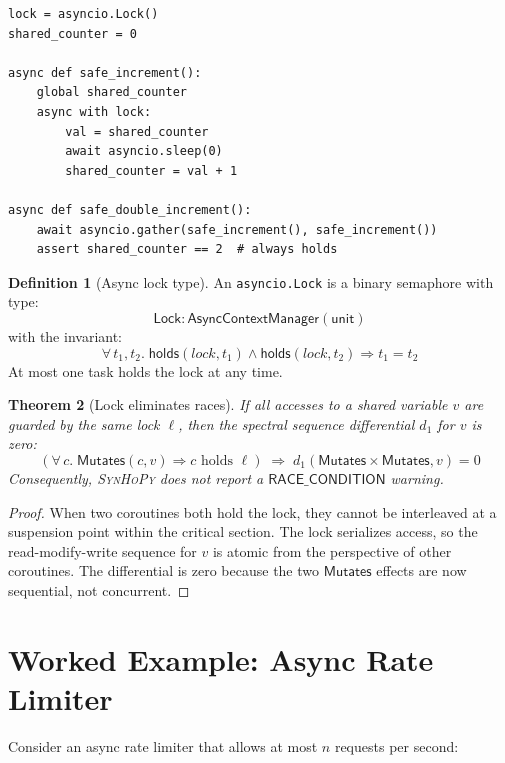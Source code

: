 \documentclass[11pt,a4paper]{report}
\theoremstyle{definition}
\newtheorem{definition}{Definition}[chapter]
\theoremstyle{plain}
\newtheorem{theorem}[definition]{Theorem}
\newcommand{\Mutates}{\mathsf{Mutates}}
\newcommand{\synhopy}{\textsc{SynHoPy}}
\begin{document}
\begin{lstlisting}[style=python]
lock = asyncio.Lock()
shared_counter = 0

async def safe_increment():
    global shared_counter
    async with lock:
        val = shared_counter
        await asyncio.sleep(0)
        shared_counter = val + 1

async def safe_double_increment():
    await asyncio.gather(safe_increment(), safe_increment())
    assert shared_counter == 2  # always holds
\end{lstlisting}

\begin{definition}[Async lock type]
An \lstinline[style=python]{asyncio.Lock} is a binary semaphore with type:
\[
  \mathsf{Lock} : \mathsf{AsyncContextManager}(\mathsf{unit})
\]
with the invariant:
\[
  \forall\, t_1, t_2.\;
    \mathsf{holds}(\mathit{lock}, t_1) \wedge
    \mathsf{holds}(\mathit{lock}, t_2) \Rightarrow t_1 = t_2
\]
At most one task holds the lock at any time.
\end{definition}

\begin{theorem}[Lock eliminates races]
If all accesses to a shared variable $v$ are guarded by the same lock
$\ell$, then the spectral sequence differential $d_1$ for $v$ is zero:
\[
  \left(\forall\, c.\; \Mutates(c, v) \Rightarrow
    c \text{ holds } \ell\right) \;\Rightarrow\;
  d_1(\Mutates \times \Mutates, v) = 0
\]
Consequently, \synhopy{} does not report a $\mathsf{RACE\_CONDITION}$
warning.
\end{theorem}
\begin{proof}
When two coroutines both hold the lock, they cannot be interleaved at
a suspension point within the critical section.  The lock serializes
access, so the read-modify-write sequence for $v$ is atomic from the
perspective of other coroutines.  The differential is zero because the
two $\Mutates$ effects are now sequential, not concurrent.
\end{proof}

\section{Worked Example: Async Rate Limiter}

Consider an async rate limiter that allows at most $n$ requests per
second:
\end{document}
